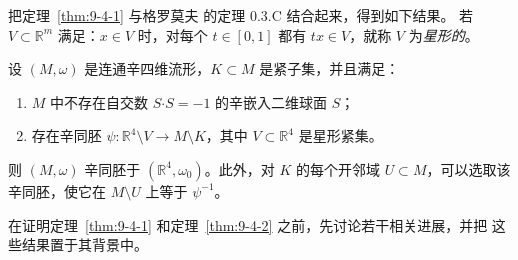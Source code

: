 把定理~\ref{thm:9-4-1} 与格罗莫夫  的定理 0.3.C 结合起来，得到如下结果。
若 $V\subset\mathbb R^m$ 满足：$x\in V$ 时，对每个 $t\in[0,1]$ 都有 $tx\in V$，就称
$V$ 为\emph{星形的}。

\begin{theorem}\label{thm:9-4-2}
设 $(M,\omega)$ 是连通辛四维流形，$K\subset M$ 是紧子集，并且满足：
\begin{enumerate}[label=(\roman*),leftmargin=3em]
\item $M$ 中不存在自交数
$S\mathbin{\boldsymbol\cdot}S=-1$ 的辛嵌入二维球面 $S$；
\item 存在辛同胚
$\psi:\mathbb R^4\setminus V\to M\setminus K$，其中
$V\subset\mathbb R^4$ 是星形紧集。
\end{enumerate}
则 $(M,\omega)$ 辛同胚于 $(\mathbb R^4,\omega_0)$。此外，对 $K$ 的每个开邻域
$U\subset M$，可以选取该辛同胚，使它在 $M\setminus U$ 上等于 $\psi^{-1}$。
\end{theorem}

在证明定理~\ref{thm:9-4-1} 和定理~\ref{thm:9-4-2} 之前，先讨论若干相关进展，并把
这些结果置于其背景中。

